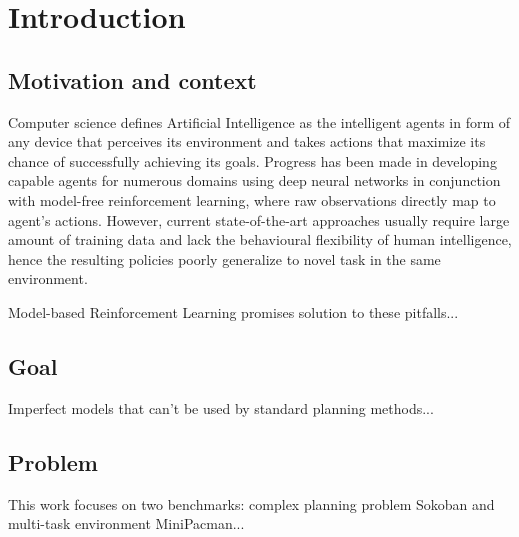 \section{Introduction}

\subsection{Motivation and context}

Computer science defines Artificial Intelligence as the intelligent agents in form of any device that perceives its environment and takes actions that maximize its chance of successfully achieving its goals. Progress has been made in developing capable agents for numerous domains using deep neural networks in conjunction with model-free reinforcement learning, where raw observations directly map to agent's actions. However, current state-of-the-art approaches  usually require large amount of training data and lack the behavioural flexibility of human intelligence, hence the resulting policies poorly generalize to novel task in the same environment.

Model-based Reinforcement Learning promises solution to these pitfalls... 

\subsection{Goal}

Imperfect models that can't be used by standard planning methods... 

\subsection{Problem}

This work focuses on two benchmarks: complex planning problem Sokoban and multi-task environment MiniPacman... 
